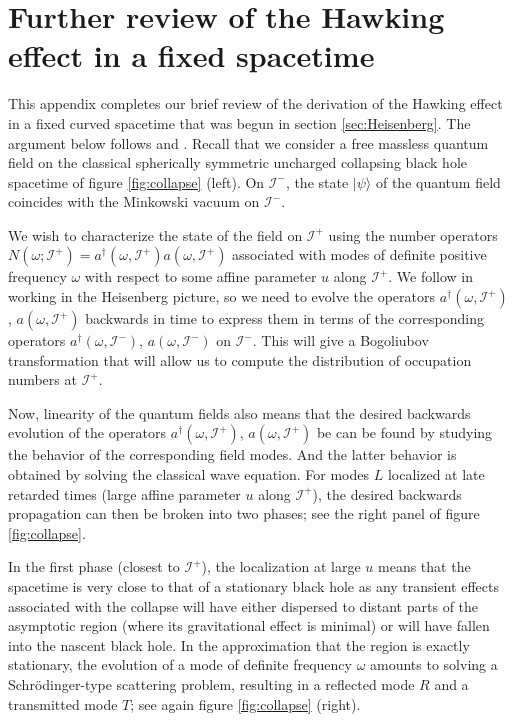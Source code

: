 \documentclass[letterpaper,12pt]{article}
\newcommand*{\scri}{\mathscr{I}} %
\begin{document}
\appendix

\section{Further review of the Hawking effect in a fixed spacetime}
\label{sec:MoreRev}

This appendix completes our brief review of the derivation of the Hawking effect in a fixed curved spacetime that was begun in section \ref{sec:Heisenberg}.  The argument below follows \cite{Hawking:1974sw} and \cite{Jacobson:2003vx}.  Recall that we consider a free massless quantum field on the classical spherically symmetric uncharged collapsing black hole spacetime of figure \ref{fig:collapse} (left).  On $\scri^-$, the state $|\psi\rangle$ of the quantum field coincides with the Minkowski vacuum on $\scri^-$.

We wish to characterize the state of the field on $\scri^+$ using the number operators $N(\omega; \scri^+) = a^\dagger(\omega,\scri^+)a(\omega, \scri^+)$ associated with modes of definite positive frequency $\omega$ with respect to some affine parameter $u$ along $\scri^+$. We follow  \cite{Hawking:1974sw} in working in the Heisenberg picture, so we need to evolve the operators $a^\dagger(\omega,\scri^+)$, $a(\omega, \scri^+)$ backwards in time to express them in terms of the corresponding operators $a^\dagger(\omega,\scri^-)$, $a(\omega, \scri^-)$ on $\scri^-$.  This will give a Bogoliubov transformation that will allow us to compute the distribution of occupation numbers at $\scri^+$.

Now, linearity of the quantum fields also means that the desired backwards evolution of the operators $a^\dagger(\omega,\scri^+)$, $a(\omega, \scri^+)$ be can be found by studying the behavior of the corresponding field modes.  And the latter behavior is obtained by solving the classical wave equation.  For modes $L$ localized at late retarded times (large affine parameter $u$ along $\scri^+$), the desired backwards propagation can then be broken into two phases; see the right panel of figure \ref{fig:collapse}.

In the first phase (closest to $\scri^+$), the localization at large $u$ means that the spacetime is very close to that of a stationary black hole as any transient effects associated with the collapse will have either dispersed to distant parts of the asymptotic region (where its gravitational effect is minimal) or will have fallen into the nascent black hole.  In the approximation that the region is exactly stationary, the evolution of a mode of definite frequency $\omega$ amounts to solving a Schr\"odinger-type scattering problem, resulting in a reflected mode $R$ and a transmitted mode $T$; see again figure \ref{fig:collapse} (right).
\end{document}
